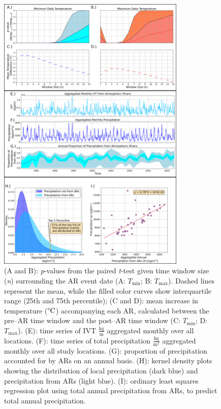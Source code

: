 \documentclass[12pts,draft]{AR_analysis_}
\begin{document}

\begin{figure}[H]
\centering
\includegraphics[width=0.8\textwidth]{./images/large.png}
\caption{(A and B): \emph{p}-values from the paired \emph{t}-test given
	time window size (\emph{n}) surrounding the AR event date (A:
	$T_{\text{min}}$; B: $T_{\text{max}}$). Dashed lines represent the
		mean, while the filled color curves show interquartile range
		(25th and 75th percentile); 
	(C and D): mean increase in temperature ($\mathrm{\degree C}$) 
	accompanying each AR, calculated between the pre--AR 
	time window and the post--AR time window 
	(C: $T_{\text{min}}$; D: $T_{\text{max}}$).
	(E): time series of IVT $\mathrm{\frac{kg}{m}}$ aggregated monthly 
	over all locations.
	(F): time series of total precipitation $\mathrm{\frac{kg}{m^{2}}}$ 
	aggregated monthly over all study locations. 
	(G): proportion of precipitation accounted for by
	ARs on an annual basis. 
	(H): kernel density plots showing the distribution of
	local precipitation (dark blue) and precipitation from ARs
	(light blue). 
	(I): ordinary least squares regression plot
	using total annual precipitation from ARs, to predict total annual
	precipitation.}
	
	
\label{fig:large} 
\end{figure}
\end{document}
